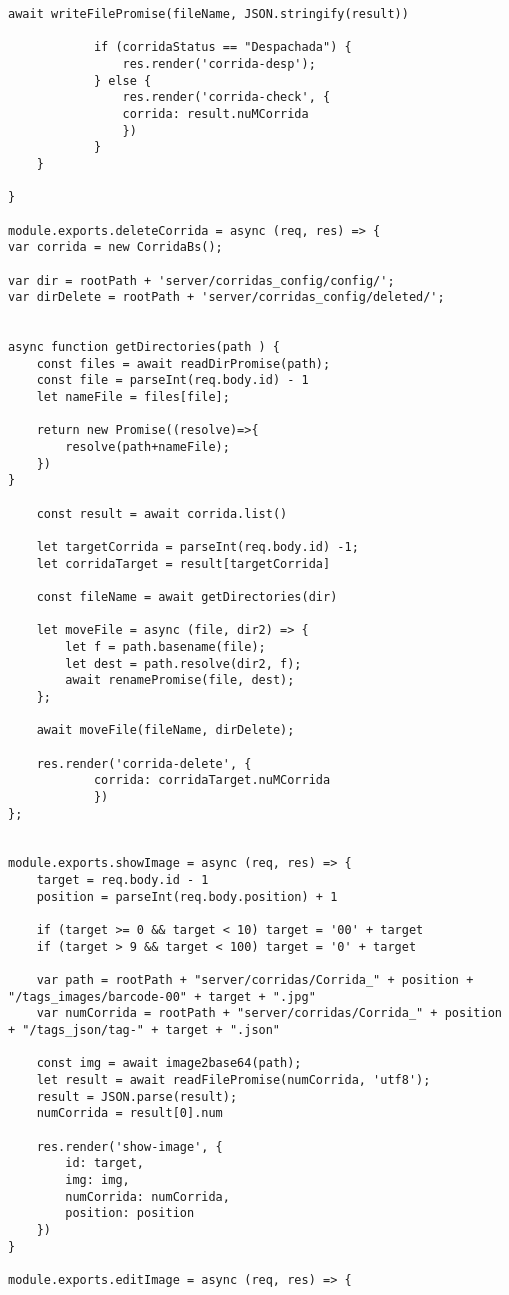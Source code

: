 \begin{lstlisting}[caption=Exemplo do código dos \textit{controllers}]
			await writeFilePromise(fileName, JSON.stringify(result))

			if (corridaStatus == "Despachada") {
				res.render('corrida-desp');
			} else {
				res.render('corrida-check', {
				corrida: result.nuMCorrida
				})
			}
	}

}

module.exports.deleteCorrida = async (req, res) => {
var corrida = new CorridaBs();

var dir = rootPath + 'server/corridas_config/config/';
var dirDelete = rootPath + 'server/corridas_config/deleted/';


async function getDirectories(path ) {
	const files = await readDirPromise(path);
	const file = parseInt(req.body.id) - 1
	let nameFile = files[file];

	return new Promise((resolve)=>{
		resolve(path+nameFile);
	})
}

 	const result = await corrida.list()

	let targetCorrida = parseInt(req.body.id) -1;
	let corridaTarget = result[targetCorrida]

	const fileName = await getDirectories(dir)

	let moveFile = async (file, dir2) => {
		let f = path.basename(file);
		let dest = path.resolve(dir2, f);
		await renamePromise(file, dest);
	};

	await moveFile(fileName, dirDelete);

	res.render('corrida-delete', {
			corrida: corridaTarget.nuMCorrida
			})
};


module.exports.showImage = async (req, res) => {
	target = req.body.id - 1
	position = parseInt(req.body.position) + 1

	if (target >= 0 && target < 10) target = '00' + target
	if (target > 9 && target < 100) target = '0' + target

	var path = rootPath + "server/corridas/Corrida_" + position + "/tags_images/barcode-00" + target + ".jpg"
	var numCorrida = rootPath + "server/corridas/Corrida_" + position + "/tags_json/tag-" + target + ".json"
	
	const img = await image2base64(path);
	let result = await readFilePromise(numCorrida, 'utf8');
	result = JSON.parse(result);
	numCorrida = result[0].num

	res.render('show-image', {
		id: target,
		img: img, 
		numCorrida: numCorrida,
		position: position
	})
}

module.exports.editImage = async (req, res) => {


\end{lstlisting}
